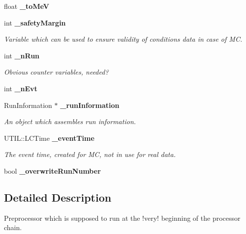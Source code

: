 \begin{DoxyCompactItemize}
\item 
float {\bfseries \-\_\-to\-Me\-V}\label{classmarlin_1_1RunInfoProcessor_abbcb57bbb8ed02b4cfd48e81e5792d60}

\item 
int {\bf \-\_\-safety\-Margin}\label{classmarlin_1_1RunInfoProcessor_aaf0d50434eb4366d31750a485d105294}

\begin{DoxyCompactList}\small\item\em Variable which can be used to ensure validity of conditions data in case of M\-C. \end{DoxyCompactList}\item 
int {\bf \-\_\-n\-Run}\label{classmarlin_1_1RunInfoProcessor_a424bd272282d83451deec7a1b3ed65d6}

\begin{DoxyCompactList}\small\item\em Obvious counter variables, needed? \end{DoxyCompactList}\item 
int {\bfseries \-\_\-n\-Evt}\label{classmarlin_1_1RunInfoProcessor_abfcb80607e137bb4cac4a50cb0704a07}

\item 
Run\-Information $\ast$ {\bf \-\_\-run\-Information}\label{classmarlin_1_1RunInfoProcessor_ac4fc44266d6145b8190937b9cce47c8e}

\begin{DoxyCompactList}\small\item\em An object which assembles run information. \end{DoxyCompactList}\item 
U\-T\-I\-L\-::\-L\-C\-Time {\bf \-\_\-event\-Time}\label{classmarlin_1_1RunInfoProcessor_a892d2aa27765a45ee078d8bc713aa88f}

\begin{DoxyCompactList}\small\item\em The event time, created for M\-C, not in use for real data. \end{DoxyCompactList}\item 
bool {\bfseries \-\_\-overwrite\-Run\-Number}\label{classmarlin_1_1RunInfoProcessor_ad5d607ab4fe985cfad5e419a4ea513a8}

\end{DoxyCompactItemize}


\subsection{Detailed Description}
Preprocessor which is supposed to run at the !very! beginning of the processor chain. 

